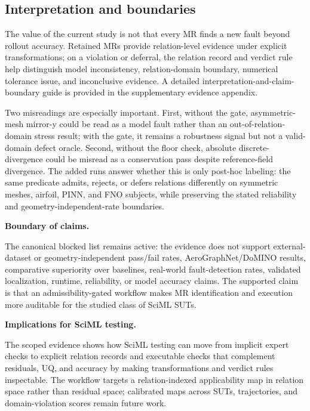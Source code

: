 \documentclass[preprint,12pt,authoryear]{elsarticle}
\begin{document}
\subsection{Interpretation and boundaries}
\label{sec:discussion}
\label{subsec:still-blocked}
\label{subsec:scoped-interpretation}

The value of the current study is not that every MR finds a new fault beyond rollout accuracy. Retained MRs provide relation-level evidence under explicit transformations; on a violation or deferral, the relation record and verdict rule help distinguish model inconsistency, relation-domain boundary, numerical tolerance issue, and inconclusive evidence. A detailed interpretation-and-claim-boundary guide is provided in the supplementary evidence appendix.

Two misreadings are especially important. First, without the gate, asymmetric-mesh mirror-y could be read as a model fault rather than an out-of-relation-domain stress result; with the gate, it remains a robustness signal but not a valid-domain defect oracle. Second, without the floor check, absolute discrete-divergence could be misread as a conservation pass despite reference-field divergence. The added runs answer whether this is only post-hoc labeling: the same predicate admits, rejects, or defers relations differently on symmetric meshes, airfoil, PINN, and FNO subjects, while preserving the stated reliability and geometry-independent-rate boundaries.

\textbf{Boundary of claims.}
\label{subsec:boundary-claims}

The canonical blocked list remains active: the evidence does not support external-dataset or geometry-independent pass/fail rates, AeroGraphNet/DoMINO results, comparative superiority over baselines, real-world fault-detection rates, validated localization, runtime, reliability, or model accuracy claims. The supported claim is that an admissibility-gated workflow makes MR identification and execution more auditable for the studied class of SciML SUTs.

\textbf{Implications for SciML testing.}
\label{subsec:implications}

The scoped evidence shows how SciML testing can move from implicit expert checks to explicit relation records and executable checks that complement residuals, UQ, and accuracy by making transformations and verdict rules inspectable. The workflow targets a relation-indexed applicability map in relation space rather than residual space; calibrated maps across SUTs, trajectories, and domain-violation scores remain future work.
\end{document}
